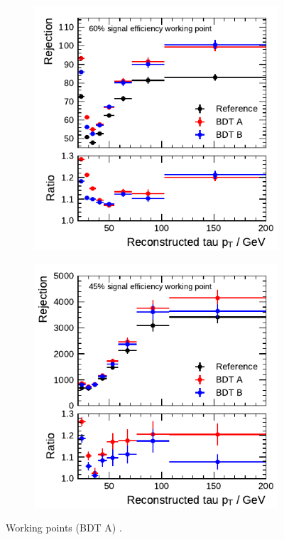 \begin{figure}[ht]
  \begin{subfigure}[t]{0.48\textwidth}
    \centering
    \includegraphics{./figures/bdt_perf/rejection/post_gridsearch_1p/rejection_tight.pdf}
  \end{subfigure}\hfill
  \begin{subfigure}[t]{0.48\textwidth}
    \centering
    \includegraphics{./figures/bdt_perf/rejection/post_gridsearch_3p/rejection_tight.pdf}
  \end{subfigure}
  \caption{Working points (BDT A) .
    }
\end{figure}


